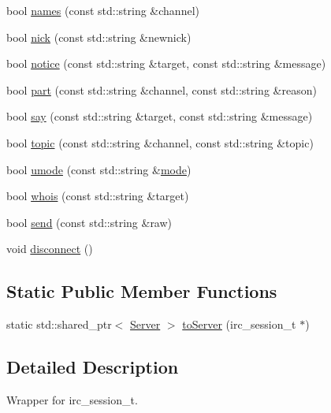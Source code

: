 \begin{DoxyCompactItemize}
\item 
bool \hyperlink{a00035_aec442c5c19a7aa0bdbbd2c333cc166a2}{names} (const std\-::string \&channel)
\item 
bool \hyperlink{a00035_ac48dc97273391c97191277c4aa327878}{nick} (const std\-::string \&newnick)
\item 
bool \hyperlink{a00035_a688985cff9ebe0fba8b08aea45d2f743}{notice} (const std\-::string \&target, const std\-::string \&message)
\item 
bool \hyperlink{a00035_a7639f81e2352f9c15fa92371e804f3f4}{part} (const std\-::string \&channel, const std\-::string \&reason)
\item 
bool \hyperlink{a00035_a5f2c115906eb2c117e705912dbc7d6ca}{say} (const std\-::string \&target, const std\-::string \&message)
\item 
bool \hyperlink{a00035_a3a1060fc5ee87566d8706f649ecb1e1e}{topic} (const std\-::string \&channel, const std\-::string \&topic)
\item 
bool \hyperlink{a00035_aaf051c9594168e0c88227442c7510c49}{umode} (const std\-::string \&\hyperlink{a00035_a279db04d81937d22ec68f2e804ab7d24}{mode})
\item 
bool \hyperlink{a00035_aaf6879d15dd0e6ecd457ee445b3c376b}{whois} (const std\-::string \&target)
\item 
bool \hyperlink{a00035_ab31c27f8e724f21e0df5de2bf155bdce}{send} (const std\-::string \&raw)
\item 
void \hyperlink{a00035_a192d7ceb5e1215e562d4674fafb65fe0}{disconnect} ()
\end{DoxyCompactItemize}
\subsection*{Static Public Member Functions}
\begin{DoxyCompactItemize}
\item 
static std\-::shared\-\_\-ptr$<$ \hyperlink{a00055}{Server} $>$ \hyperlink{a00035_a1ed9c9fe2ba41d117ed9b7213b71c01a}{to\-Server} (irc\-\_\-session\-\_\-t $\ast$)
\end{DoxyCompactItemize}


\subsection{Detailed Description}
Wrapper for irc\-\_\-session\-\_\-t. 

